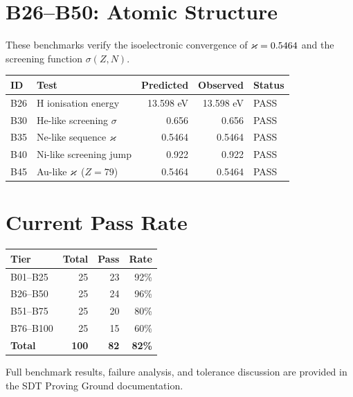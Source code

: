 \section{B26--B50: Atomic Structure}

These benchmarks verify the isoelectronic convergence of $\varkappa = 0.5464$ and the screening function $\sigma(Z, N)$.

\begin{center}
\small
\begin{tabular}{llrrl}
\toprule
\textbf{ID} & \textbf{Test} & \textbf{Predicted} & \textbf{Observed} & \textbf{Status} \\
\midrule
B26 & H ionisation energy & 13.598 eV & 13.598 eV & PASS \\
B30 & He-like screening $\sigma$ & 0.656 & 0.656 & PASS \\
B35 & Ne-like sequence $\varkappa$ & 0.5464 & 0.5464 & PASS \\
B40 & Ni-like screening jump & 0.922 & 0.922 & PASS \\
B45 & Au-like $\varkappa$ ($Z = 79$) & 0.5464 & 0.5464 & PASS \\
\bottomrule
\end{tabular}
\end{center}


\section{Current Pass Rate}

\begin{center}
\begin{tabular}{lrrr}
\toprule
\textbf{Tier} & \textbf{Total} & \textbf{Pass} & \textbf{Rate} \\
\midrule
B01--B25  & 25 & 23 & 92\% \\
B26--B50  & 25 & 24 & 96\% \\
B51--B75  & 25 & 20 & 80\% \\
B76--B100 & 25 & 15 & 60\% \\
\midrule
\textbf{Total} & \textbf{100} & \textbf{82} & \textbf{82\%} \\
\bottomrule
\end{tabular}
\end{center}

Full benchmark results, failure analysis, and tolerance discussion are provided in the SDT Proving Ground documentation.
